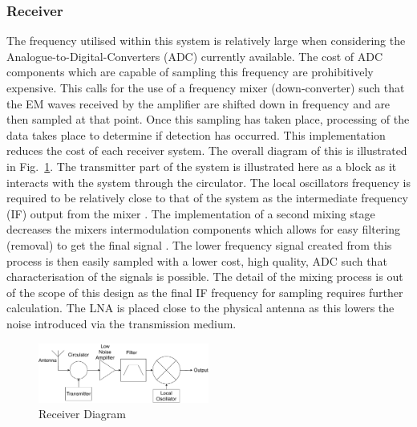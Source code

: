 \documentclass[11pt]{witseiepaper}
\begin{document}
\begin{bibunit}[witseie]
\subsubsection{Receiver} \label{sec:Receiver}
The frequency utilised within this system is relatively large when considering the Analogue-to-Digital-Converters (ADC) currently available. The cost of ADC components which are capable of sampling this frequency are prohibitively expensive.
This calls for the use of a frequency mixer (down-converter) such that the EM waves received by the amplifier are shifted down in frequency and are then sampled at that point. Once this sampling has taken place, processing of the data takes place to determine if detection has occurred.
This implementation reduces the cost of each receiver system. The overall diagram of this is illustrated in Fig.~\ref{fig:ReceiverDiagram}. The transmitter part of the system is illustrated here as a block as it interacts with the system through the circulator. The local oscillators frequency is required to be relatively close to that of the system as the intermediate frequency (IF) output from the mixer \cite[p.~397-398]{radarHandbook}.
The implementation of a second mixing stage decreases the mixers intermodulation components which allows for easy filtering (removal) to get the final signal \cite[p.~398]{radarHandbook}.
The lower frequency signal created from this process is then easily sampled with a lower cost, high quality, ADC such that characterisation of the signals is possible. The detail of the mixing process is out of the scope of this design as the final IF frequency for sampling requires further calculation.
The LNA is placed close to the physical antenna as this lowers the noise introduced via the transmission medium.%
\begin{center}
    \begin{figure}
        \centering
        \includegraphics[width=0.5\textwidth]{ReceiverDiagram.pdf}
        \caption{Receiver Diagram}
        \label{fig:ReceiverDiagram}    
    \end{figure}
\end{center}




\end{bibunit}
\end{document}
